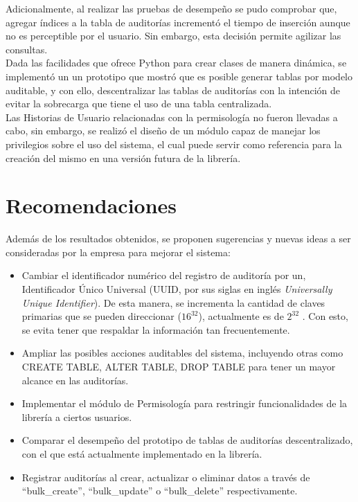 Adicionalmente, al realizar las pruebas de desempeño se pudo comprobar que, agregar índices a la tabla de auditorías incrementó el tiempo de inserción aunque no es perceptible por el usuario. Sin embargo, esta decisión permite agilizar las consultas.\\

Dada las facilidades que ofrece Python para crear clases de manera dinámica, se implementó un un prototipo que mostró que es posible generar tablas por modelo auditable, y con ello, descentralizar las tablas de auditorías con la intención de evitar la sobrecarga que tiene el uso de una tabla centralizada.\\

Las Historias de Usuario relacionadas con la permisología no fueron llevadas a cabo, sin embargo, se realizó el diseño de un módulo capaz de manejar los privilegios sobre el uso del sistema, el cual puede servir como referencia para la creación del mismo en una versión futura de la librería.

{}
\section*{Recomendaciones}

Además de los resultados obtenidos, se proponen sugerencias y nuevas ideas a ser consideradas por la empresa para mejorar el sistema:

\begin{itemize}
    \item Cambiar el identificador numérico del registro de auditoría por un, Identificador Único Universal (UUID, por sus siglas en inglés \textit{Universally Unique Identifier}). De esta manera, se incrementa la cantidad de claves primarias que se pueden direccionar ($16^{32}$), actualmente es de $2^{32}$ . Con esto, se evita tener que respaldar la información tan frecuentemente.
    \item Ampliar las posibles acciones auditables del sistema, incluyendo otras como CREATE TABLE, ALTER TABLE, DROP TABLE para tener un mayor alcance en las auditorías.
    \item Implementar el módulo de Permisología para restringir funcionalidades de la librería a ciertos usuarios.
    \item Comparar el desempeño del prototipo de tablas de auditorías descentralizado, con el que está actualmente implementado en la librería.
    \item Registrar auditorías al crear, actualizar o eliminar datos a través de “bulk\_create”, “bulk\_update” o “bulk\_delete” respectivamente.
\end{itemize}
